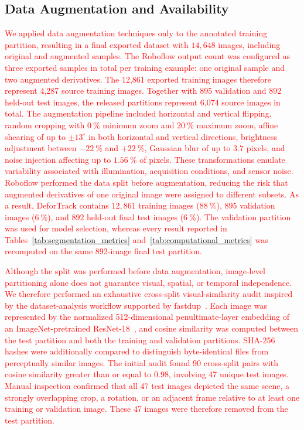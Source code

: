 \documentclass[journal,article,submit,pdftex,moreauthors]{Definitions/mdpi}
\begin{document}
\subsection{Data Augmentation and Availability}
\label{sec:data_augmentation}

\textcolor{red}{We applied data augmentation techniques only to the annotated training partition, resulting in a final exported dataset with $14,648$ images, including original and augmented samples. The Roboflow output count was configured as three exported samples in total per training example: one original sample and two augmented derivatives. The 12,861 exported training images therefore represent 4,287 source training images. Together with 895 validation and 892 held-out test images, the released partitions represent 6,074 source images in total. The augmentation pipeline included horizontal and vertical flipping, random cropping with $0~\%$ minimum zoom and $20~\%$ maximum zoom, affine shearing of up to $\pm 13^{\circ}$ in both horizontal and vertical directions, brightness adjustment between $-22~\%$ and $+22~\%$, Gaussian blur of up to $3.7$ pixels, and noise injection affecting up to $1.56~\%$ of pixels. These transformations emulate variability associated with illumination, acquisition conditions, and sensor noise. Roboflow performed the data split before augmentation, reducing the risk that augmented derivatives of one original image were assigned to different subsets. As a result, DeforTrack contains $12,861$ training images ($88~\%$), $895$ validation images ($6~\%$), and $892$ held-out final test images ($6~\%$). The validation partition was used for model selection, whereas every result reported in Tables~\ref{tab:segmentation_metrics} and~\ref{tab:computational_metrics} was recomputed on the same 892-image final test partition.}

\textcolor{red}{Although the split was performed before data augmentation, image-level partitioning alone does not guarantee visual, spatial, or temporal independence. We therefore performed an exhaustive cross-split visual-similarity audit inspired by the dataset-analysis workflow supported by fastdup~\cite{fastdup2026}. Each image was represented by the normalized 512-dimensional penultimate-layer embedding of an ImageNet-pretrained ResNet-18~\cite{he2016deep}, and cosine similarity was computed between the test partition and both the training and validation partitions. SHA-256 hashes were additionally compared to distinguish byte-identical files from perceptually similar images. The initial audit found 90 cross-split pairs with cosine similarity greater than or equal to 0.98, involving 47 unique test images. Manual inspection confirmed that all 47 test images depicted the same scene, a strongly overlapping crop, a rotation, or an adjacent frame relative to at least one training or validation image. These 47 images were therefore removed from the test partition.}
\end{document}
